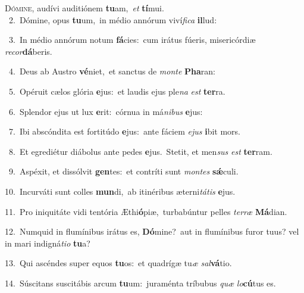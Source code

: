 \lettrine{\initial\textcolor{\initialcolor}{D}}{ómine,} audívi auditiónem \textbf{tu}\-am,~\star \textit{et} \textbf{tí}\-mui.\\
{\numbfont\textcolor{\numbcolor}{~2.}}~Dómine, opus \textbf{tu}\-um,~\star in médio annórum viví\-\textit{fi}\-\textit{ca} \textbf{il}\-lud:\par
{\numbfont\textcolor{\numbcolor}{~3.}}~In médio annórum notum \textbf{fá}\-cies:~\star cum irátus fúeris, misericórdiæ \textit{re}\-\textit{cor}\textbf{dá}beris.\par
{\numbfont\textcolor{\numbcolor}{~4.}}~Deus ab Austro \textbf{vé}\-niet,~\star et sanctus de \textit{mon}\-\textit{te} \textbf{Pha}\-ran:\par
{\numbfont\textcolor{\numbcolor}{~5.}}~Opéruit cælos glória \textbf{e}\-jus:~\star et laudis ejus ple\textit{na} \textit{est} \textbf{ter}\-ra.\par
{\numbfont\textcolor{\numbcolor}{~6.}}~Splendor ejus ut lux \textbf{e}\-rit:~\star córnua in má\-\textit{ni}\-\textit{bus} \textbf{e}\-jus:\par
{\numbfont\textcolor{\numbcolor}{~7.}}~Ibi abscóndita est fortitúdo \textbf{e}\-jus:~\star ante fáciem \textit{e}\-\textit{jus} \textbf{i}\-bit mors.\par
{\numbfont\textcolor{\numbcolor}{~8.}}~Et egrediétur diábolus ante pedes \textbf{e}\-jus.~\star Stetit, et men\textit{sus} \textit{est} \textbf{ter}\-ram.\par
{\numbfont\textcolor{\numbcolor}{~9.}}~Aspéxit, et dissólvit \textbf{gen}\-tes:~\star et contríti sunt \textit{mon}\-\textit{tes} \textbf{sǽ}\-culi.\par
{\numbfont\textcolor{\numbcolor}{10.}}~Incurváti sunt colles \textbf{mun}\-di,~\star ab itinéribus æterni\-\textit{tá}\-\textit{tis} \textbf{e}\-jus.\par
{\numbfont\textcolor{\numbcolor}{11.}}~Pro iniquitáte vidi tentória Æthi\-\textbf{ó}\-piæ,~\star turbabúntur pelles \textit{ter}\-\textit{ræ} \textbf{Má}\-dian.\par
{\numbfont\textcolor{\numbcolor}{12.}}~Numquid in flumínibus irátus es, \textbf{Dó}\-mine?~\star aut in flumínibus furor tuus? vel in mari indigná\-\textit{ti}\-\textit{o} \textbf{tu}\-a?\par
{\numbfont\textcolor{\numbcolor}{13.}}~Qui ascéndes super equos \textbf{tu}\-os:~\star et quadrígæ tu\textit{æ} \textit{sal}\-\textbf{vá}tio.\par
{\numbfont\textcolor{\numbcolor}{14.}}~Súscitans suscitábis arcum \textbf{tu}\-um:~\star juraménta tríbubus \textit{quæ} \textit{lo}\-\textbf{cú}tus es.\par

